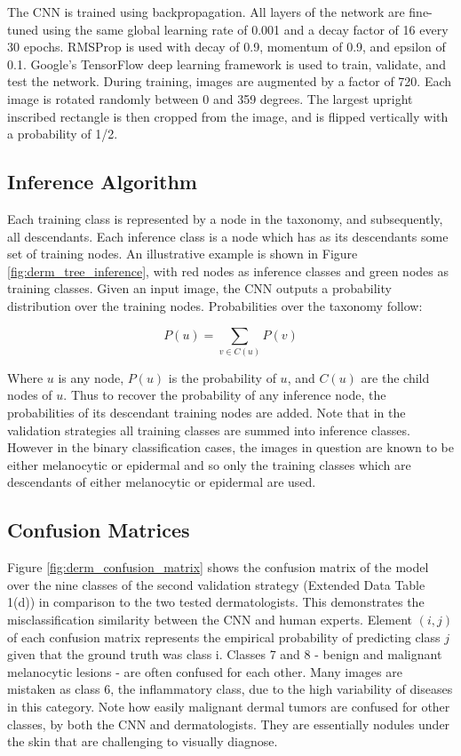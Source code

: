 The CNN is trained using backpropagation. All layers of the network are fine-tuned using the same global learning rate of 0.001 and a decay factor of 16 every 30 epochs. RMSProp is used with decay of 0.9, momentum of 0.9, and epsilon of 0.1. Google’s TensorFlow \cite{abadi2016tensorflow} deep learning framework is used to train, validate, and test the network. During training, images are augmented by a factor of 720. Each image is rotated randomly between 0 and 359 degrees. The largest upright inscribed rectangle is then cropped from the image, and is flipped vertically with a probability of 1/2. 

\subsection{Inference Algorithm}
Each training class is represented by a node in the taxonomy, and subsequently, all descendants. Each inference class is a node which has as its descendants some set of training nodes. An illustrative example is shown in Figure \ref{fig:derm_tree_inference}, with red nodes as inference classes and green nodes as training classes. Given an input image, the CNN outputs a probability distribution over the training nodes. Probabilities over the taxonomy follow:

$$P(u) = \sum_{v \in C(u)}{P(v)}$$

Where $u$ is any node, $P(u)$ is the probability of $u$, and $C(u)$ are the child nodes of $u$. Thus to recover the probability of any inference node, the probabilities of its descendant training nodes are added. Note that in the validation strategies all training classes are summed into inference classes. However in the binary classification cases, the images in question are known to be either melanocytic or epidermal and so only the training classes which are descendants of either melanocytic or epidermal are used.

\subsection{Confusion Matrices}
Figure \ref{fig:derm_confusion_matrix} shows the confusion matrix of the model over the nine classes of the second validation strategy (Extended Data Table 1(d)) in comparison to the two tested dermatologists. This demonstrates the misclassification similarity between the CNN and human experts. Element $(i, j)$ of each confusion matrix represents the empirical probability of predicting class $j$ given that the ground truth was class i. Classes 7 and 8 - benign and malignant melanocytic lesions - are often confused for each other. Many images are mistaken as class 6, the inflammatory class, due to the high variability of diseases in this category. Note how easily malignant dermal tumors are confused for other classes, by both the CNN and dermatologists. They are essentially nodules under the skin that are challenging to visually diagnose. 

